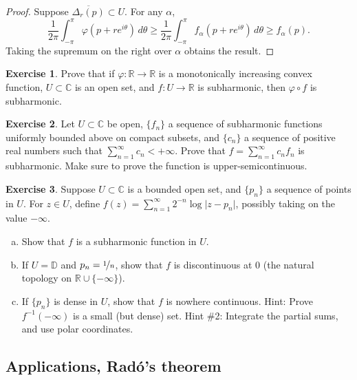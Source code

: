 \documentclass[12pt,openany]{book}
\newcommand{\sabs}[1]{\lvert {#1} \rvert}
\newcommand{\C}{{\mathbb{C}}}
\newcommand{\R}{{\mathbb{R}}}
\newcommand{\D}{{\mathbb{D}}}
\theoremstyle{plain}
\theoremstyle{remark}
\theoremstyle{definition}
\newenvironment{exbox}{%
    \def\FrameCommand{\vrule width 1pt \relax\hspace{10pt}}%
    \MakeFramed{\advance\hsize-\width\FrameRestore}%
}{%
    \endMakeFramed
}
\newenvironment{exparts}{%
    \leavevmode\begin{enumerate}[a),noitemsep,topsep=0pt,parsep=0pt,partopsep=0pt]
}{%
    \end{enumerate}
}
\theoremstyle{exercise}
\newtheorem{exercise}{Exercise}[section]
\theoremstyle{example}
\begin{document}
\begin{proof}
Suppose $\overline{\Delta_r(p)} \subset U$.  For any $\alpha$,
\begin{equation*}
\frac{1}{2\pi} \int_{-\pi}^{\pi} \varphi (p+re^{i\theta})\, d\theta 
\geq
\frac{1}{2\pi} \int_{-\pi}^{\pi} f_\alpha (p+re^{i\theta})\, d\theta 
\geq f_\alpha(p) .
\end{equation*}
Taking the supremum on the right over $\alpha$ obtains the result.
\end{proof}

\begin{exbox}
\begin{exercise}
Prove that if $\varphi \colon \R \to \R$ is a monotonically increasing
convex function, $U \subset \C$ is an open set, and $f \colon U \to \R$
is subharmonic, then $\varphi \circ f$ is subharmonic.
\end{exercise}

\begin{exercise}
Let $U \subset \C$ be open, $\{ f_n \}$ a sequence of 
subharmonic functions uniformly bounded above on compact subsets, and 
$\{ c_n \}$ a sequence of positive real numbers such that
$\sum_{n=1}^\infty c_n < +\infty$.
Prove that $f = \sum_{n=1}^\infty c_n f_n$ is subharmonic.  Make sure to prove
the function is upper-semicontinuous.
\end{exercise}

\begin{exercise}
Suppose $U \subset \C$ is a bounded open set, and $\{ p_n \}$ a sequence of points in
$U$. For $z \in U$, define
$f(z) = \sum_{n=1}^\infty 2^{-n} \log \sabs{z-p_n}$, possibly taking on the
value $-\infty$.
\begin{exparts}
\item
Show that $f$ is a subharmonic function in $U$.
\item
If $U = \D$ and $p_n = \nicefrac{1}{n}$, show that $f$ is discontinuous at $0$
(the natural topology on $\R \cup \{ -\infty \}$).
\item
If $\{ p_n \}$ is dense in $U$, show that $f$ 
is nowhere continuous.
Hint: Prove $f^{-1}(-\infty)$ is a small (but dense) set.
Hint \#2: Integrate the partial sums, and use polar coordinates.
\end{exparts}
\end{exercise}
\end{exbox}

\subsection{Applications, Rad\'o's theorem}
\end{document}
